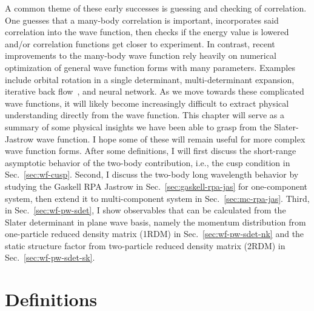 A common theme of these early successes is guessing and checking of correlation. One guesses that a many-body correlation is important, incorporates said correlation into the wave function, then checks if the energy value is lowered and/or correlation functions get closer to experiment. %
In contrast, recent improvements to the many-body wave function rely heavily on numerical optimization of general wave function forms with many parameters. Examples include orbital rotation in a single determinant, multi-determinant expansion, iterative back flow~\cite{PhysRevB.91.115106}, and neural network.
As we move towards these complicated wave functions, it will likely become increasingly difficult to extract physical understanding directly from the wave function.
This chapter will serve as a summary of some physical insights we have been able to grasp from the Slater-Jastrow wave function. I hope some of these will remain useful for more complex wave function forms. After some definitions, I will first discuss the short-range asymptotic behavior of the two-body contribution, i.e., the cusp condition in Sec.~\ref{sec:wf-cusp}. Second, I discuss the two-body long wavelength behavior by studying the Gaskell RPA Jastrow in Sec.~\ref{sec:gaskell-rpa-jas} for one-component system, then extend it to multi-component system in Sec.~\ref{sec:mc-rpa-jas}. Third, in Sec.~\ref{sec:wf-pw-sdet}, I show observables that can be calculated from the Slater determinant in plane wave basis, namely the momentum distribution from  one-particle reduced density matrix (1RDM) in Sec.~\ref{sec:wf-pw-sdet-nk} and the static structure factor from two-particle reduced density matrix (2RDM) in Sec.~\ref{sec:wf-pw-sdet-sk}.

\section{Definitions}

